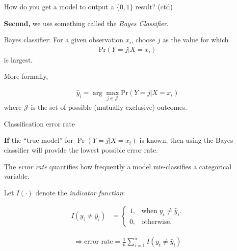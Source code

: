 \documentclass[aspectratio=169]{beamer}
\begin{document}
\begin{frame}{How do you get a model to output a $\{0,1\}$ result? (ctd)}

\textbf{Second,} we use something called the \textit{Bayes Classifier}.  

\vspace{5mm}


\begin{block}{Bayes classifier:}
\textbf{} For a given observation $x_i$, choose $j$ as the value for which
\begin{align*}
\text{Pr}(Y=j|X = x_i)
\end{align*}
is largest. 
\end{block}

\vspace{5mm}

More formally,

\pause
\begin{align*}
\hat{y}_i = \arg \max_{j\in \mathcal{J}} \text{Pr}(Y=j|X = x_i)
\end{align*}
where $\mathcal{J}$ is the set of possible (mutually exclusive) outcomes.

\end{frame}

\begin{frame}{Classification error rate}

\textbf{If }the ``true model'' for $\Pr(Y=j|X = x_i)$ is known, then using the Bayes classifier will provide the lowest possible error rate.  

\vspace{5mm}

The \textit{error rate} quantifies how frequently a model mis-classifies a categorical variable.  

\vspace{5mm}
Let $I(\cdot)$ denote the \textit{indicator function}:

\pause
\begin{align*}
I(y_i \neq \hat{y}_i) &=\begin{cases}
    1, & \text{when } y_i \neq \hat{y}_i.\\
    0, & \text{otherwise}.
  \end{cases}  
  \end{align*}

\begin{align*}
\Rightarrow \text{error rate} = \frac{1}{n}\sum_{i=1}^n I (y_i \neq \hat{y}_i)
\end{align*}

\end{frame}
\end{document}
